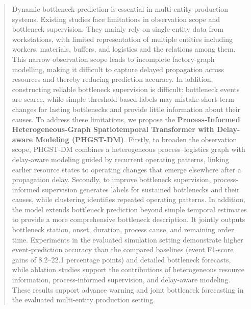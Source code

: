 \documentclass[a4paper,fleqn]{cas-dc}
\begin{document}
\begin{abstract}
Dynamic bottleneck prediction is essential in multi-entity production systems.
Existing studies face limitations in observation scope and bottleneck supervision.
They mainly rely on single-entity data from workstations, with limited representation of multiple entities including workers, materials, buffers, and logistics and the relations among them.
This narrow observation scope leads to incomplete factory-graph modelling, making it difficult to capture delayed propagation across resources and thereby reducing prediction accuracy.
In addition, constructing reliable bottleneck supervision is difficult: bottleneck events are scarce, while simple threshold-based labels may mistake short-term changes for lasting bottlenecks and provide little information about their causes.
To address these limitations, we propose the \textbf{Process-Informed Heterogeneous-Graph Spatiotemporal Transformer with Delay-aware Modeling (PHGST-DM)}.
Firstly, to broaden the observation scope, PHGST-DM combines a heterogeneous process--logistics graph with delay-aware modeling guided by recurrent operating patterns, linking earlier resource states to operating changes that emerge elsewhere after a propagation delay.
Secondly, to improve bottleneck supervision, process-informed supervision generates labels for sustained bottlenecks and their causes, while clustering identifies repeated operating patterns.
In addition, the model extends bottleneck prediction beyond simple temporal estimates to provide a more comprehensive bottleneck description.
It jointly outputs bottleneck station, onset, duration, process cause, and remaining order time.
Experiments in the evaluated simulation setting demonstrate higher event-prediction accuracy than the compared baselines (event F1-score gains of 8.2--22.1 percentage points) and detailed bottleneck forecasts, while ablation studies support the contributions of heterogeneous resource information, process-informed supervision, and delay-aware modeling.
These results support advance warning and joint bottleneck forecasting in the evaluated multi-entity production setting.


\end{abstract}
\end{document}
